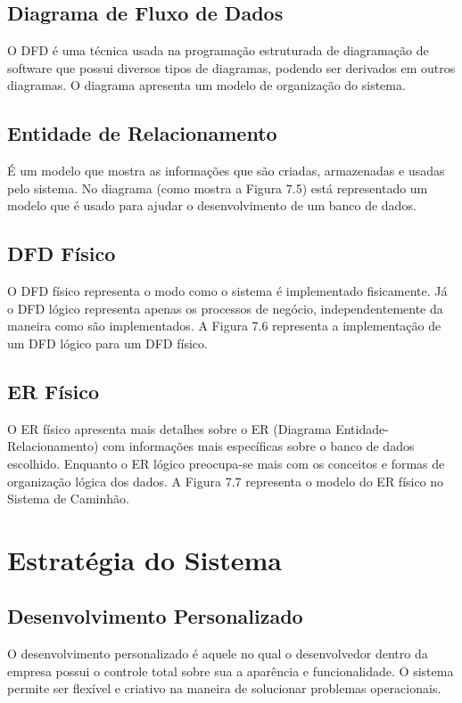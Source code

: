 \subsection{Diagrama de Fluxo de Dados}
O DFD é uma técnica usada na programação estruturada de diagramação de software que possui diversos tipos de diagramas, podendo ser derivados em outros diagramas. O diagrama apresenta um modelo de organização do sistema.


\subsection{Entidade de Relacionamento}
É um modelo que mostra as informações que são criadas, armazenadas e usadas pelo sistema.
No diagrama (como mostra a Figura 7.5) está representado um modelo que é usado para ajudar o desenvolvimento de um banco de dados.

\subsection{DFD Físico}
O DFD físico representa o modo como o sistema é implementado fisicamente. Já o DFD lógico representa apenas os processos de negócio, independentemente da maneira como são implementados. A Figura 7.6 representa a implementação de um DFD lógico para um DFD físico.

\subsection{ER Físico}
O ER físico apresenta mais detalhes sobre o ER (Diagrama Entidade-Relacionamento) com informações mais específicas sobre o banco de dados escolhido. Enquanto o ER lógico preocupa-se mais com os conceitos e formas de organização lógica dos dados. A Figura 7.7 representa o modelo do ER físico no Sistema de Caminhão.

\section{Estratégia do Sistema}

\subsection{Desenvolvimento Personalizado}
 O desenvolvimento personalizado é aquele no qual o desenvolvedor dentro da empresa possui o controle total sobre sua a aparência e funcionalidade. O sistema permite ser flexível e criativo na maneira de solucionar problemas operacionais.

